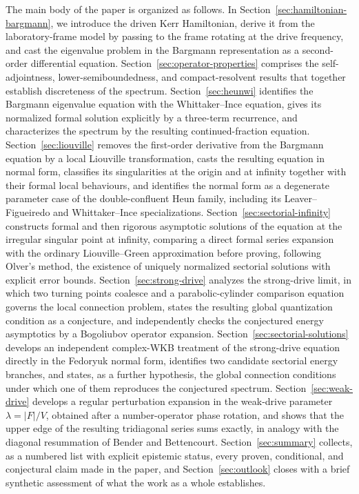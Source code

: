\documentclass[11pt]{article}
\theoremstyle{remark}
\begin{document}
The main body of the paper is organized as follows.  In
Section~\ref{sec:hamiltonian-bargmann}, we introduce the driven Kerr
Hamiltonian, derive it from the laboratory-frame model by passing to the
frame rotating at the drive frequency, and cast the eigenvalue problem in
the Bargmann representation as a second-order differential equation.
Section~\ref{sec:operator-properties} comprises the self-adjointness,
lower-semiboundedness, and compact-resolvent results that together
establish discreteness of the spectrum.
Section~\ref{sec:heunwi} identifies the Bargmann eigenvalue equation with
the Whittaker--Ince equation, gives its normalized formal solution
explicitly by a three-term recurrence, and characterizes the spectrum by
the resulting continued-fraction equation.
Section~\ref{sec:liouville} removes the first-order derivative from the
Bargmann equation by a local Liouville transformation, casts the resulting
equation in normal form, classifies its singularities at the origin and at
infinity together with their formal local behaviours, and identifies the
normal form as a degenerate parameter case of the double-confluent Heun
family, including its Leaver--Figueiredo and Whittaker--Ince
specializations.
Section~\ref{sec:sectorial-infinity} constructs formal and then rigorous
asymptotic solutions of the equation at the irregular singular point at
infinity, comparing a direct formal series expansion with the ordinary
Liouville--Green approximation before proving, following Olver's method,
the existence of uniquely normalized sectorial solutions with explicit
error bounds.
Section~\ref{sec:strong-drive} analyzes the strong-drive limit, in which
two turning points coalesce and a parabolic-cylinder comparison equation
governs the local connection problem, states the resulting global
quantization condition as a conjecture, and independently checks the
conjectured energy asymptotics by a Bogoliubov operator expansion.
Section~\ref{sec:sectorial-solutions} develops an independent complex-WKB
treatment of the strong-drive equation directly in the Fedoryuk normal
form, identifies two candidate sectorial energy branches, and states, as a
further hypothesis, the global connection conditions under which one of
them reproduces the conjectured spectrum.
Section~\ref{sec:weak-drive} develops a regular perturbation expansion in
the weak-drive parameter \(\lambda=|F|/V\), obtained after a
number-operator phase rotation, and shows that the upper edge of the
resulting tridiagonal series sums exactly, in analogy with the diagonal
resummation of Bender and Bettencourt.
Section~\ref{sec:summary} collects, as a numbered list with explicit
epistemic status, every proven, conditional, and conjectural claim made in
the paper, and Section~\ref{sec:outlook} closes with a brief synthetic
assessment of what the work as a whole establishes.
\end{document}
